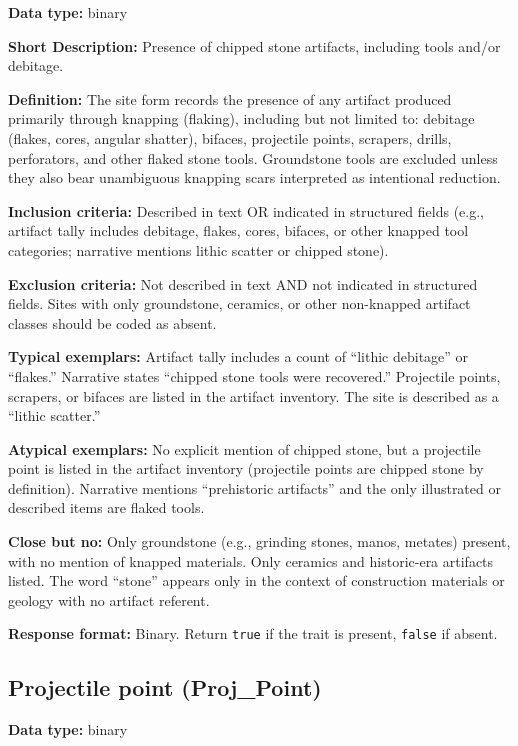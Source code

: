 \documentclass[
]{article}
\begin{document}
\textbf{Data type:} binary

\textbf{Short Description:} Presence of chipped stone artifacts,
including tools and/or debitage.

\textbf{Definition:} The site form records the presence of any artifact
produced primarily through knapping (flaking), including but not limited
to: debitage (flakes, cores, angular shatter), bifaces, projectile
points, scrapers, drills, perforators, and other flaked stone tools.
Groundstone tools are excluded unless they also bear unambiguous
knapping scars interpreted as intentional reduction.

\textbf{Inclusion criteria:} Described in text OR indicated in
structured fields (e.g., artifact tally includes debitage, flakes,
cores, bifaces, or other knapped tool categories; narrative mentions
lithic scatter or chipped stone).

\textbf{Exclusion criteria:} Not described in text AND not indicated in
structured fields. Sites with only groundstone, ceramics, or other
non-knapped artifact classes should be coded as absent.

\textbf{Typical exemplars:} Artifact tally includes a count of ``lithic
debitage'' or ``flakes.'' Narrative states ``chipped stone tools were
recovered.'' Projectile points, scrapers, or bifaces are listed in the
artifact inventory. The site is described as a ``lithic scatter.''

\textbf{Atypical exemplars:} No explicit mention of chipped stone, but a
projectile point is listed in the artifact inventory (projectile points
are chipped stone by definition). Narrative mentions ``prehistoric
artifacts'' and the only illustrated or described items are flaked
tools.

\textbf{Close but no:} Only groundstone (e.g., grinding stones, manos,
metates) present, with no mention of knapped materials. Only ceramics
and historic-era artifacts listed. The word ``stone'' appears only in
the context of construction materials or geology with no artifact
referent.

\textbf{Response format:} Binary. Return \texttt{true} if the trait is
present, \texttt{false} if absent.

\subsection{Projectile point
(Proj\_Point)}\label{projectile-point-proj_point}

\textbf{Data type:} binary
\end{document}
